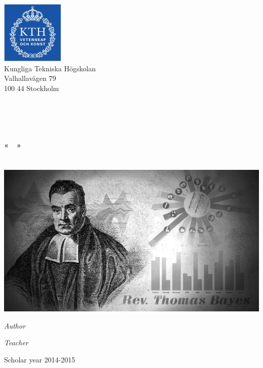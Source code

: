 \begin{center}
	\begin{minipage}[t]{0.48\textwidth}
	  \begin{flushleft}
	    \includegraphics [width=30mm]{img/logo_kth.jpg} \\[0.1cm]
		Kungliga Tekniska Högskolan\\
		Valhallavägen 79\\
		100 44 Stockholm
	  \end{flushleft}
	\end{minipage}
	\begin{minipage}[t]{0.48\textwidth}
	  \begin{flushright}
	  \end{flushright}
	\end{minipage} \\[1cm]

	\textsc{\Large \reportsubject}\\[0.3cm]
	\HRule \\[0.4cm]
	{\Huge \bfseries \reporttitle}\\[0.3cm]
	{\LARGE \bfseries «~\stagetopic~»}\\[0.3cm]
	{\Large \dateperiod}\\[0.4cm]
	\HRule \\[1.5cm]

	\includegraphics [width=0.7\linewidth]{img/icon.png} \\[1.5cm]
	\begin{minipage}[t]{0.5\textwidth}
	  \begin{flushleft} \large
	    \emph{Author}\\
	    \reportauthor
	  \end{flushleft}
	\end{minipage}
	\begin{minipage}[t]{0.4\textwidth}
	  \begin{flushright} \large
	    \emph{Teacher} \\
	    \enseignants
	  \end{flushright}
	\end{minipage}

	\vfill
	\footnotesize{Scholar year 2014-2015}
\end{center}
